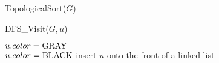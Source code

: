 \begin{algorithm}[H]
    \caption{TopologicalSort($G$)}
\end{algorithm}

\begin{algorithm}[H]
    \caption{DFS\_Visit($G, u$)}
    $u.color = \textmd{GRAY}$ \\
    $u.color = \textmd{BLACK}$
    insert $u$ onto the front of a linked list
\end{algorithm}
